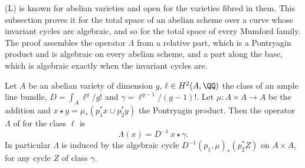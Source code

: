 \textup{(L)} is known for abelian varieties and open for the varieties fibred
in them. This subsection proves it for the total space of an abelian scheme
over a curve whose invariant cycles are algebraic, and so for the total space
of every Mumford family. The proof assembles the operator $\Lambda$ from a
relative part, which is a Pontryagin product and is algebraic on every abelian
scheme, and a part along the base, which is algebraic exactly when the
invariant cycles are.

\begin{proposition}
\label{prop:pontryaginlambda}
Let $A$ be an abelian variety of dimension $g$, $\ell\in H^{2}(A,\QQ)$ the
class of an ample line bundle, $D=\int_{A}\ell^{g}/g!$ and
$\gamma=\ell^{g-1}/(g-1)!$. Let $\mu\colon A\times A\to A$ be the addition
and $x\star y=\mu_{*}(p_{1}^{*}x\cup p_{2}^{*}y)$ the Pontryagin product.
Then the operator $\Lambda$ of  for the class $\ell$ is
\[
  \Lambda(x)=D^{-1}\,x\star\gamma .
\]
In particular $\Lambda$ is induced by the algebraic cycle
$D^{-1}(p_{1},\mu)_{*}(p_{2}^{*}Z)$ on $A\times A$, for any cycle $Z$ of
class $\gamma$.
\end{proposition}

